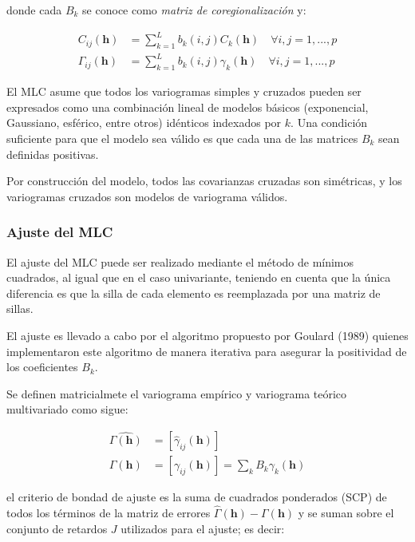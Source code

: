 \documentclass[
]{book}
\begin{document}
donde cada \(B_k\) se conoce como \textit{matriz de coregionalización} y:

\begin{align}
    C_{ij}(\textbf{h})&=\sum_{k=1}^Lb_k(i,j)C_k(\textbf{h})\quad \forall i,j=1,...,p\\
    \Gamma_{ij}(\textbf{h})&=\sum_{k=1}^Lb_k(i,j)\gamma_k(\textbf{h})\quad \forall i,j=1,...,p
\end{align}

El MLC asume que todos los variogramas simples y cruzados pueden ser expresados como una combinación lineal de modelos básicos (exponencial, Gaussiano, esférico, entre otros) idénticos indexados por \(k\). Una condición suficiente para que el modelo sea válido es que cada una de las matrices \(B_k\) sean definidas positivas.

Por construcción del modelo, todos las covarianzas cruzadas son simétricas, y los variogramas cruzados son modelos de variograma válidos.

\hypertarget{ajuste-del-mlc}{%
\subsubsection*{Ajuste del MLC}\label{ajuste-del-mlc}}

El ajuste del MLC puede ser realizado mediante el método de mínimos cuadrados, al igual que en el caso univariante, teniendo en cuenta que la única diferencia es que la silla de cada elemento es reemplazada por una matriz de sillas.

El ajuste es llevado a cabo por el algoritmo propuesto por Goulard (1989) quienes implementaron este algoritmo de manera iterativa para asegurar la positividad de los coeficientes \(B_k\).

Se definen matricialmete el variograma empírico y variograma teórico multivariado como sigue:

\begin{align}
    \hat{\Gamma(\textbf{h})}&=\left[\hat{\gamma}_{ij}(\textbf{h})\right]\\
    \Gamma(\textbf{h})&=\left[\gamma_{ij}(\textbf{h})\right]=\sum_kB_k\gamma_k(\textbf{h})
\end{align}

el criterio de bondad de ajuste es la suma de cuadrados ponderados (SCP) de todos los términos de la matriz de errores \(\hat{\Gamma}(\textbf{h})-\Gamma(\textbf{h})\) y se suman sobre el conjunto de retardos \(J\) utilizados para el ajuste; es decir:
\end{document}
